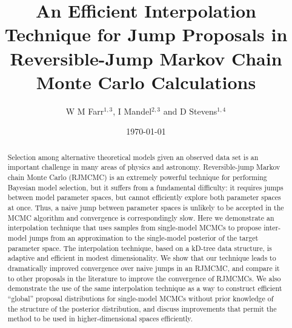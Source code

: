 \documentclass{iopart}
\begin{document}
\title[Efficient Jump Proposals in RJMCMC]{An Efficient Interpolation
  Technique for Jump Proposals in Reversible-Jump Markov Chain Monte
  Carlo Calculations}

\date{\today}

\author{W M Farr$^{1,3}$, I Mandel$^{2,3}$ and D Stevens$^{1,4}$}

\address{$^1$ Center for Interdisciplinary Exploration and Research in
  Astrophysics (CIERA), Department of Physics and Astronomy,
  Northwestern University, Evanston IL USA}

\address{$^2$ MIT Kavli Institute, Cambridge MA USA}

\address{$^3$ School of Physics and Astronomy, University of
  Birmingham, Birmingham UK}

\address{$^4$ Department of Astronomy, The Ohio State
  University, Columbus OH USA}



\begin{abstract}
  Selection among alternative theoretical models given an observed
  data set is an important challenge in many areas of physics and
  astronomy.  Reversible-jump Markov chain Monte Carlo (RJMCMC) is an
  extremely powerful technique for performing Bayesian model
  selection, but it suffers from a fundamental difficulty: it requires
  jumps between model parameter spaces, but cannot efficiently explore both parameter spaces at once.  Thus, a naive jump between parameter spaces is unlikely to be
  accepted in the MCMC algorithm and convergence is correspondingly
  slow.  Here we demonstrate an interpolation technique that uses
  samples from single-model MCMCs to propose inter-model jumps from an
  approximation to the single-model posterior of the target parameter
  space.  The interpolation technique, based on a kD-tree data
  structure, is adaptive and efficient in modest dimensionality.  We
  show that our technique leads to dramatically improved convergence
  over naive jumps in an RJMCMC, and compare it to other proposals in
  the literature to improve the convergence of RJMCMCs.  We also
  demonstrate the use of the same interpolation technique as a way to
  construct efficient ``global'' proposal distributions for
  single-model MCMCs without prior knowledge of the structure of the
  posterior distribution, and discuss improvements that permit the
  method to be used in higher-dimensional spaces efficiently.
\end{abstract}
\end{document}
